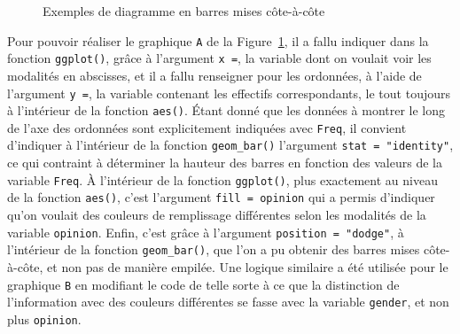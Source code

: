 \documentclass[
  letterpaper,
]{book}
\begin{document}
\begin{figure}


\caption{\label{fig-groupedBarsFigure}Exemples de diagramme en barres
mises côte-à-côte}

\end{figure}%

Pour pouvoir réaliser le graphique \texttt{A} de la
Figure~\ref{fig-groupedBarsFigure}, il a fallu indiquer dans la fonction
\texttt{ggplot()}, grâce à l'argument \texttt{x\ =}, la variable dont on
voulait voir les modalités en abscisses, et il a fallu renseigner pour
les ordonnées, à l'aide de l'argument \texttt{y\ =}, la variable
contenant les effectifs correspondants, le tout toujours à l'intérieur
de la fonction \texttt{aes()}. Étant donné que les données à montrer le
long de l'axe des ordonnées sont explicitement indiquées avec
\texttt{Freq}, il convient d'indiquer à l'intérieur de la fonction
\texttt{geom\_bar()} l'argument \texttt{stat\ =\ "identity"}, ce qui
contraint à déterminer la hauteur des barres en fonction des valeurs de
la variable \texttt{Freq}. À l'intérieur de la fonction
\texttt{ggplot()}, plus exactement au niveau de la fonction
\texttt{aes()}, c'est l'argument \texttt{fill\ =\ opinion} qui a permis
d'indiquer qu'on voulait des couleurs de remplissage différentes selon
les modalités de la variable \texttt{opinion}. Enfin, c'est grâce à
l'argument \texttt{position\ =\ "dodge"}, à l'intérieur de la fonction
\texttt{geom\_bar()}, que l'on a pu obtenir des barres mises
côte-à-côte, et non pas de manière empilée. Une logique similaire a été
utilisée pour le graphique \texttt{B} en modifiant le code de telle
sorte à ce que la distinction de l'information avec des couleurs
différentes se fasse avec la variable \texttt{gender}, et non plus
\texttt{opinion}.
\end{document}
